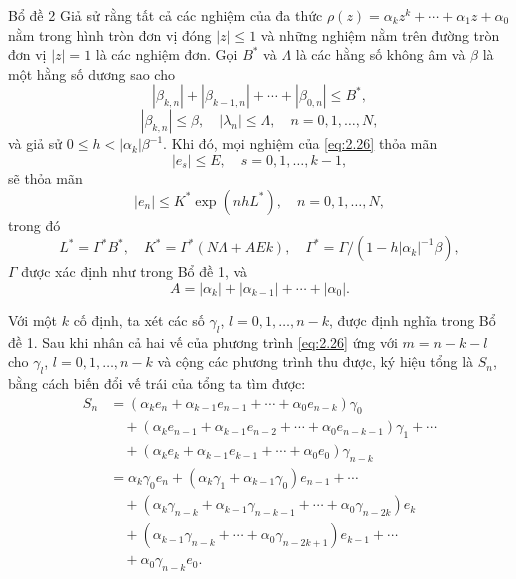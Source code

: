 \begin{baitapbox}{Bổ đề 2}
    Giả sử rằng tất cả các nghiệm của đa thức $\rho(z) = \alpha_k z^k + \cdots + \alpha_1 z + \alpha_0$ nằm trong hình tròn đơn vị đóng $|z| \le 1$ và những nghiệm nằm trên đường tròn đơn vị $|z| = 1$ là các nghiệm đơn. Gọi $B^*$ và $\Lambda$ là các hằng số không âm và $\beta$ là một hằng số dương sao cho
\begin{equation*}
    |\beta_{k,n}| + |\beta_{k-1,n}| + \cdots + |\beta_{0,n}| \le B^*,
\end{equation*}
\begin{equation*}
    |\beta_{k,n}| \le \beta, \quad |\lambda_n| \le \Lambda, \quad n = 0, 1, \dots, N,
\end{equation*}
và giả sử $0 \le h < |\alpha_k|\beta^{-1}$. Khi đó, mọi nghiệm của \eqref{eq:2.26} thỏa mãn
\begin{equation*}
    |e_s| \le E, \quad s = 0, 1, \dots, k - 1,
\end{equation*}
sẽ thỏa mãn
\begin{equation*}
    |e_n| \le K^* \exp(nhL^*), \quad n = 0, 1, \dots, N,
\end{equation*}
trong đó
\begin{equation*}
    L^* = \Gamma^* B^*, \quad K^* = \Gamma^*(N\Lambda + AEk), \quad \Gamma^* = \Gamma / (1 - h|\alpha_k|^{-1}\beta),
\end{equation*}
$\Gamma$ được xác định như trong Bổ đề 1, và
\begin{equation*}
    A = |\alpha_k| + |\alpha_{k-1}| + \cdots + |\alpha_0|.
\end{equation*}
\end{baitapbox}

Với một $k$ cố định, ta xét các số $\gamma_l$, $l = 0, 1, \dots, n - k$, được định nghĩa trong Bổ đề 1. Sau khi nhân cả hai vế của phương trình \eqref{eq:2.26} ứng với $m = n - k - l$ cho $\gamma_l$, $l = 0, 1, \dots, n - k$ và cộng các phương trình thu được, ký hiệu tổng là $S_n$, bằng cách biến đổi vế trái của tổng ta tìm được:
\begin{align*}
S_n &= (\alpha_k e_n + \alpha_{k-1} e_{n-1} + \cdots + \alpha_0 e_{n-k})\gamma_0 \\
&\quad + (\alpha_k e_{n-1} + \alpha_{k-1} e_{n-2} + \cdots + \alpha_0 e_{n-k-1})\gamma_1 + \cdots \\
&\quad + (\alpha_k e_k + \alpha_{k-1} e_{k-1} + \cdots + \alpha_0 e_0)\gamma_{n-k} \\
&= \alpha_k \gamma_0 e_n + (\alpha_k \gamma_1 + \alpha_{k-1} \gamma_0)e_{n-1} + \cdots \\
&\quad + (\alpha_k \gamma_{n-k} + \alpha_{k-1} \gamma_{n-k-1} + \cdots + \alpha_0 \gamma_{n-2k})e_k \\
&\quad + (\alpha_{k-1} \gamma_{n-k} + \cdots + \alpha_0 \gamma_{n-2k+1})e_{k-1} + \cdots \\
&\quad + \alpha_0 \gamma_{n-k} e_0 .
\end{align*}

